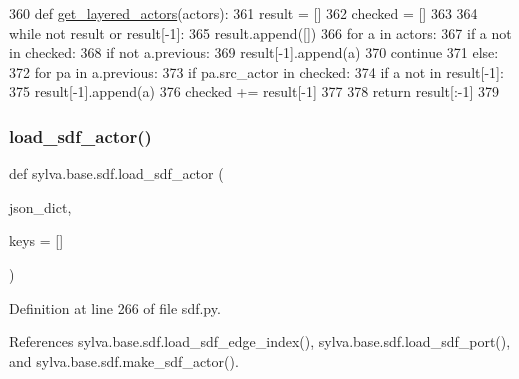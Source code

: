 \begin{DoxyCode}
360     \textcolor{keyword}{def }\hyperlink{namespacesylva_1_1base_1_1sdf_a1e0fb379d9b6a1f2adb650611bdb49e6}{get\_layered\_actors}(actors):
361         result = []
362         checked = []
363 
364         \textcolor{keywordflow}{while} \textcolor{keywordflow}{not} result \textcolor{keywordflow}{or} result[-1]:
365             result.append([])
366             \textcolor{keywordflow}{for} a \textcolor{keywordflow}{in} actors:
367                 \textcolor{keywordflow}{if} a \textcolor{keywordflow}{not} \textcolor{keywordflow}{in} checked:
368                     \textcolor{keywordflow}{if} \textcolor{keywordflow}{not} a.previous:
369                         result[-1].append(a)
370                         \textcolor{keywordflow}{continue}
371                     \textcolor{keywordflow}{else}:
372                         \textcolor{keywordflow}{for} pa \textcolor{keywordflow}{in} a.previous:
373                             \textcolor{keywordflow}{if} pa.src\_actor \textcolor{keywordflow}{in} checked:
374                                 \textcolor{keywordflow}{if} a \textcolor{keywordflow}{not} \textcolor{keywordflow}{in} result[-1]:
375                                     result[-1].append(a)
376             checked += result[-1]
377 
378         \textcolor{keywordflow}{return} result[:-1]
379 
\end{DoxyCode}
\mbox{\label{namespacesylva_1_1base_1_1sdf_a14b2bfbb0fd81d1e114b670f13f718f1}} 
\subsubsection{\texorpdfstring{load\+\_\+sdf\+\_\+actor()}{load\_sdf\_actor()}}
{\footnotesize\ttfamily def sylva.\+base.\+sdf.\+load\+\_\+sdf\+\_\+actor (\begin{DoxyParamCaption}\item[{}]{json\+\_\+dict,  }\item[{}]{keys = {\ttfamily \mbox{[}\mbox{]}} }\end{DoxyParamCaption})}



Definition at line 266 of file sdf.\+py.



References sylva.\+base.\+sdf.\+load\+\_\+sdf\+\_\+edge\+\_\+index(), sylva.\+base.\+sdf.\+load\+\_\+sdf\+\_\+port(), and sylva.\+base.\+sdf.\+make\+\_\+sdf\+\_\+actor().



